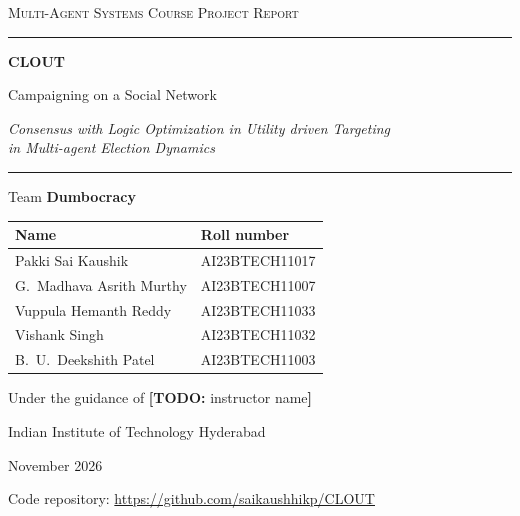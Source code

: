 \documentclass[11pt,a4paper,oneside]{report}
\newcommand{\todo}[1]{\textcolor{todo}{\textbf{[TODO:} #1\textbf{]}}}
\newcommand{\repo}{\url{https://github.com/saikaushhikp/CLOUT}}
\begin{document}
\begin{titlepage}
\centering
\vspace*{1.2cm}
{\large\scshape\color{accent} Multi-Agent Systems \textendash{} Course Project Report\par}
\vspace{1.4cm}
{\color{ink}\rule{\linewidth}{0.8pt}\par}
\vspace{0.5cm}
{\fontsize{30}{36}\selectfont\bfseries\color{ink} CLOUT\par}
\vspace{0.35cm}
{\LARGE\color{ink} Campaigning on a Social Network\par}
\vspace{0.4cm}
{\large\itshape Consensus with Logic Optimization in Utility driven Targeting\\
in Multi-agent Election Dynamics\par}
\vspace{0.5cm}
{\color{ink}\rule{\linewidth}{0.8pt}\par}
\vspace{1.2cm}

{\large Team \textbf{Dumbocracy}\par}
\vspace{0.6cm}
\begin{tabular}{ll}
\toprule
\textbf{Name} & \textbf{Roll number} \\
\midrule
Pakki Sai Kaushik            & AI23BTECH11017 \\
G.~Madhava Asrith Murthy     & AI23BTECH11007 \\
Vuppula Hemanth Reddy        & AI23BTECH11033 \\
Vishank Singh                & AI23BTECH11032 \\
B.~U.~Deekshith Patel        & AI23BTECH11003 \\
\bottomrule
\end{tabular}

\vspace{1.4cm}
{\large Under the guidance of \todo{instructor name}\par}
\vspace{0.3cm}
{\large Indian Institute of Technology Hyderabad\par}
\vspace{0.3cm}
{\large November 2026\par}
\vfill
{\small Code repository: \repo\par}
\end{titlepage}
\end{document}
